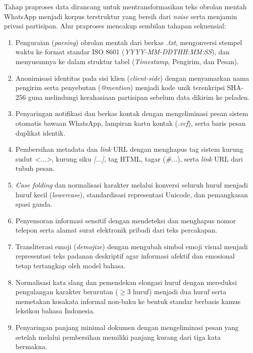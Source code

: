 Tahap praproses data dirancang untuk mentransformasikan teks obrolan mentah WhatsApp menjadi korpus terstruktur yang bersih dari \textit{noise} serta menjamin privasi partisipan. Alur praproses mencakup sembilan tahapan sekuensial:

\begin{enumerate}[label=\alph*., leftmargin=*, itemsep=2pt]
	\item Penguraian (\textit{parsing}) obrolan mentah dari berkas \textit{.txt}, mengonversi stempel waktu ke format standar ISO 8601 (\textit{YYYY-MM-DDTHH:MM:SS}), dan menyusunnya ke dalam struktur tabel (\textit{Timestamp}, Pengirim, dan Pesan).
	\item Anonimisasi identitas pada sisi klien (\textit{client-side}) dengan menyamarkan nama pengirim serta penyebutan (\textit{@mention}) menjadi kode unik terenkripsi SHA-256 guna melindungi kerahasiaan partisipan sebelum data dikirim ke peladen.
	\item Penyaringan notifikasi dan berkas kontak dengan mengeliminasi pesan sistem otomatis bawaan WhatsApp, lampiran kartu kontak (\textit{.vcf}), serta baris pesan duplikat identik.
	\item Pembersihan metadata dan \textit{link} URL dengan menghapus tag sistem kurung sudut \textit{<...>}, kurung siku \textit{[...]}, tag HTML, tagar (\textit{\#...}), serta \textit{link} URL dari tubuh pesan.
	\item \textit{Case folding} dan normalisasi karakter melalui konversi seluruh huruf menjadi huruf kecil (\textit{lowercase}), standardisasi representasi Unicode, dan pemangkasan spasi ganda.
	\item Penyensoran informasi sensitif dengan mendeteksi dan menghapus nomor telepon serta alamat surat elektronik pribadi dari teks percakapan.
	\item Transliterasi emoji (\textit{demojize}) dengan mengubah simbol emoji visual menjadi representasi teks padanan deskriptif agar informasi afektif dan emosional tetap tertangkap oleh model bahasa.
	\item Normalisasi kata slang dan pemendekan elongasi huruf dengan mereduksi pengulangan karakter berurutan ($\ge 3$ huruf) menjadi dua huruf serta memetakan kosakata informal non-baku ke bentuk standar berbasis kamus leksikon bahasa Indonesia.
	\item Penyaringan panjang minimal dokumen dengan mengeliminasi pesan yang setelah melalui pembersihan memiliki panjang kurang dari tiga kata bermakna.
\end{enumerate}

